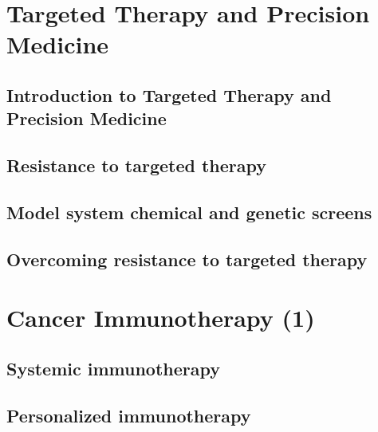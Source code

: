 \documentclass[
]{book}
\begin{document}
\hypertarget{PrecisionMedicine}{%
\chapter{Targeted Therapy and Precision Medicine}\label{PrecisionMedicine}}

\hypertarget{introduction-to-targeted-therapy-and-precision-medicine}{%
\section{Introduction to Targeted Therapy and Precision Medicine}\label{introduction-to-targeted-therapy-and-precision-medicine}}

\hypertarget{resistance-to-targeted-therapy}{%
\section{Resistance to targeted therapy}\label{resistance-to-targeted-therapy}}

\hypertarget{model-system-chemical-and-genetic-screens}{%
\section{Model system chemical and genetic screens}\label{model-system-chemical-and-genetic-screens}}

\hypertarget{overcoming-resistance-to-targeted-therapy}{%
\section{Overcoming resistance to targeted therapy}\label{overcoming-resistance-to-targeted-therapy}}

\hypertarget{cancerimmuno1}{%
\chapter{Cancer Immunotherapy (1)}\label{cancerimmuno1}}

\hypertarget{systemic-immunotherapy}{%
\section{Systemic immunotherapy}\label{systemic-immunotherapy}}

\hypertarget{personalized-immunotherapy}{%
\section{Personalized immunotherapy}\label{personalized-immunotherapy}}
\end{document}
